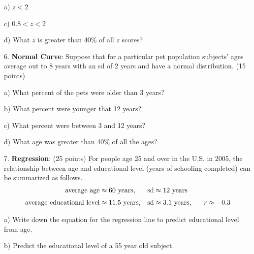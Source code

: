 \documentclass[10pt]{article}
\begin{document}
\hspace{10pt} a) $z < 2$
\vspace{.6in}

\hspace{10pt} c) $0.8 < z < 2$
\vspace{.6in}

\hspace{10pt} d) What $z$ is greater than 40\% of all $z$ scores?
\vspace{1in}

6. \textbf{Normal Curve}:  Suppose that for a particular pet population
subjects' ages average out to 8 years with an sd of 2 years and have
a normal distribution. (15 points)

\hspace{10pt} a) What percent of the pets were older than 3 years?
\vspace{1in}

\hspace{10pt} b) What percent were younger that 12 years?
\vspace{1in}

\hspace{10pt} c) What percent were between 3 and 12 years?
\vspace{1in}

\hspace{10pt} d) What age was greater than 40\% of all the ages?
\vfill
\eject
{\ }


7. \textbf{Regression}: 
(25 points) For people age 25 and over in the U.S. in 2005, the relationship between
age and educational level (years of schooling completed) can be summarized as
follows. \vspace{-5pt}
\begin{align*}
\mbox{average age}         & \approx \mbox{60 years,}    & \mbox{sd} & \approx \mbox{12 years}\\[3pt]
\mbox{average educational level}  & \approx \mbox{11.5 years,}  & \mbox{sd} & \approx \mbox{3.1 years,
   \hspace{15pt}} r\approx -0.3
\end{align*}\vspace{-10pt}

\hspace{20pt} a) Write down the equation for the regression line  to
predict educational level from age.
\vspace{1.4in}

\hspace{20pt} b) Predict the educational level of a 55 year old subject.
\vspace{1.4in}
\end{document}
